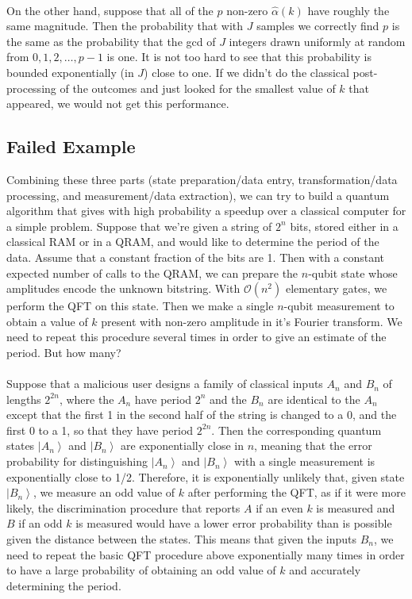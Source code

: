 \documentclass[]{article}
\begin{document}
\\
On the other hand, suppose that all of the $p$ non-zero $\hat{\alpha}(k)$ have roughly the same magnitude. Then the probability that with $J$ samples we correctly find $p$ is the same as the probability that the gcd of $J$ integers drawn uniformly at random from $0,1,2,\ldots,p-1$ is one. It is not too hard to see that this probability is bounded exponentially (in $J$) close to one. If we didn't do the classical post-processing of the outcomes and just looked for the smallest value of $k$ that appeared, we would not get this performance.

\subsection*{Failed Example}
Combining these three parts (state preparation/data entry,  transformation/data processing, and measurement/data extraction), we can try to build a quantum algorithm that gives with high probability a speedup over a classical computer for a simple problem. Suppose that we're given a string of $2^n$ bits, stored either in a classical RAM or in a QRAM, and would like to determine the period of the data. Assume that a constant fraction of the bits are 1. Then with a constant expected number of calls to the QRAM, we can prepare the $n$-qubit state whose amplitudes encode the unknown bitstring. With $\mathcal{O}(n^2)$ elementary gates, we perform the QFT on this state. Then we make a single $n$-qubit measurement to obtain a value of $k$ present with non-zero amplitude in it's Fourier transform. We need to repeat this procedure several times in order to give an estimate of the period. But how many?\\
\\
Suppose that a malicious user designs a family of classical inputs $A_n$ and $B_n$ of lengths $2^{2n}$, where the $A_n$ have period $2^n$ and the $B_n$ are identical to the $A_n$ except that the first 1 in the second half of the string is changed to a 0, and the first 0 to a 1, so that they have period $2^{2n}$. Then the corresponding quantum states $\left\vert A_n\right\rangle$ and $\left\vert B_n\right\rangle$ are exponentially close in $n$, meaning that the error probability for distinguishing $\left\vert A_n\right\rangle$ and $\left\vert B_n\right\rangle$ with a single measurement is exponentially close to 1/2. Therefore, it is exponentially unlikely that, given state $\left\vert B_n\right\rangle$, we measure an odd value of $k$ after performing the QFT, as if it were more likely, the discrimination procedure that reports $A$ if an even $k$ is measured and $B$ if an odd $k$ is measured would have a lower error probability than is possible given the distance between the states. This means that given the inputs $B_n$, we need to repeat the basic QFT procedure above exponentially many times in order to have a large probability of obtaining an odd value of $k$ and accurately determining the period.\\
\end{document}

